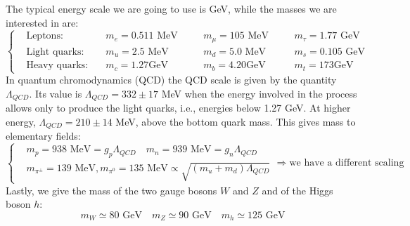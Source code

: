 \documentclass[../main.tex]{subfiles}
\begin{document}
The typical energy scale we are going to use is GeV, while the masses we are interested in are:
\[
\left\{
\begin{aligned}
&\text{Leptons: } &&m_e=0.511\text{ MeV} \quad &&m_\mu=105\text{ MeV} \quad &&m_\tau=1.77\text{ GeV}\\
&\text{Light quarks: } &&m_u=2.5\text{ MeV} \quad &&m_d=5.0\text{ MeV} \quad &&m_s=0.105\text{ GeV}\\
&\text{Heavy quarks: } &&m_c=1.27\text{GeV} \quad &&m_b=4.20\text{GeV} \quad &&m_t=173\text{GeV}
\end{aligned}
\right.
\]
In quantum chromodynamics (QCD) the QCD scale is given by the quantity $\Lambda_{QCD}$. Its value is $\Lambda_{QCD}=332\pm17$ MeV when the energy involved in the process allows only to produce the light quarks, i.e., energies below 1.27 GeV. At higher energy, $\Lambda_{QCD}=210\pm14$ MeV, above the bottom quark mass. This gives mass to elementary fields:
\[
\left\{
\begin{aligned}
&m_p=938\text{ MeV}=g_p\Lambda_{QCD} \quad m_n=939\text{ MeV}=g_n\Lambda_{QCD}\\
&m_{\pi^\pm}=139\text{ MeV}, m_{\pi^0}=135\text{ MeV}\propto\sqrt{(m_u+m_d)\Lambda_{QCD}}
\end{aligned}
\right.
\Rightarrow \text{we have a different scaling}
\]
Lastly, we give the mass of the two gauge bosons $W$ and $Z$ and of the Higgs boson $h$:
\[
m_W\simeq80\text{ GeV} \quad m_Z\simeq90\text{ GeV} \quad m_h\simeq125\text{ GeV}
\]
\end{document}
